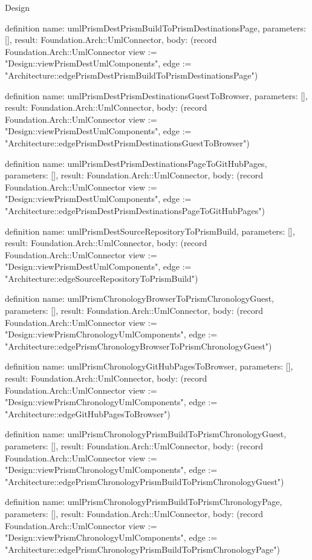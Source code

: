 \begin{lexlean}{Design}
\begin{semanticmodule}
definition{
  name: umlPrismDestPrismBuildToPrismDestinationsPage,
  parameters: [],
  result: Foundation.Arch::UmlConnector,
  body: (record Foundation.Arch::UmlConnector {view := "Design::viewPrismDestUmlComponents", edge := "Architecture::edgePrismDestPrismBuildToPrismDestinationsPage"})
}

definition{
  name: umlPrismDestPrismDestinationsGuestToBrowser,
  parameters: [],
  result: Foundation.Arch::UmlConnector,
  body: (record Foundation.Arch::UmlConnector {view := "Design::viewPrismDestUmlComponents", edge := "Architecture::edgePrismDestPrismDestinationsGuestToBrowser"})
}

definition{
  name: umlPrismDestPrismDestinationsPageToGitHubPages,
  parameters: [],
  result: Foundation.Arch::UmlConnector,
  body: (record Foundation.Arch::UmlConnector {view := "Design::viewPrismDestUmlComponents", edge := "Architecture::edgePrismDestPrismDestinationsPageToGitHubPages"})
}

definition{
  name: umlPrismDestSourceRepositoryToPrismBuild,
  parameters: [],
  result: Foundation.Arch::UmlConnector,
  body: (record Foundation.Arch::UmlConnector {view := "Design::viewPrismDestUmlComponents", edge := "Architecture::edgeSourceRepositoryToPrismBuild"})
}

definition{
  name: umlPrismChronologyBrowserToPrismChronologyGuest,
  parameters: [],
  result: Foundation.Arch::UmlConnector,
  body: (record Foundation.Arch::UmlConnector {view := "Design::viewPrismChronologyUmlComponents", edge := "Architecture::edgePrismChronologyBrowserToPrismChronologyGuest"})
}

definition{
  name: umlPrismChronologyGitHubPagesToBrowser,
  parameters: [],
  result: Foundation.Arch::UmlConnector,
  body: (record Foundation.Arch::UmlConnector {view := "Design::viewPrismChronologyUmlComponents", edge := "Architecture::edgeGitHubPagesToBrowser"})
}

definition{
  name: umlPrismChronologyPrismBuildToPrismChronologyGuest,
  parameters: [],
  result: Foundation.Arch::UmlConnector,
  body: (record Foundation.Arch::UmlConnector {view := "Design::viewPrismChronologyUmlComponents", edge := "Architecture::edgePrismChronologyPrismBuildToPrismChronologyGuest"})
}

definition{
  name: umlPrismChronologyPrismBuildToPrismChronologyPage,
  parameters: [],
  result: Foundation.Arch::UmlConnector,
  body: (record Foundation.Arch::UmlConnector {view := "Design::viewPrismChronologyUmlComponents", edge := "Architecture::edgePrismChronologyPrismBuildToPrismChronologyPage"})
}


\end{semanticmodule}
\end{lexlean}
